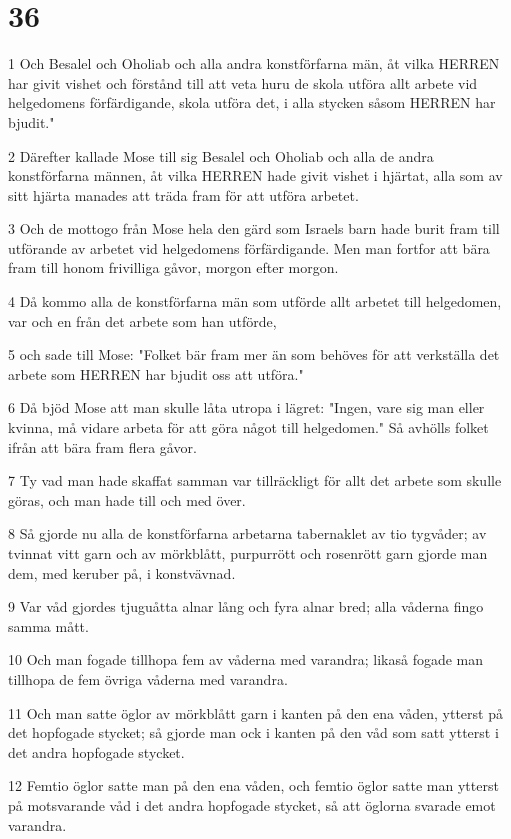 \chapter{36}

\par 1 Och Besalel och Oholiab och alla andra konstförfarna män, åt vilka HERREN har givit vishet och förstånd till att veta huru de skola utföra allt arbete vid helgedomens förfärdigande, skola utföra det, i alla stycken såsom HERREN har bjudit."
\par 2 Därefter kallade Mose till sig Besalel och Oholiab och alla de andra konstförfarna männen, åt vilka HERREN hade givit vishet i hjärtat, alla som av sitt hjärta manades att träda fram för att utföra arbetet.
\par 3 Och de mottogo från Mose hela den gärd som Israels barn hade burit fram till utförande av arbetet vid helgedomens förfärdigande. Men man fortfor att bära fram till honom frivilliga gåvor, morgon efter morgon.
\par 4 Då kommo alla de konstförfarna män som utförde allt arbetet till helgedomen, var och en från det arbete som han utförde,
\par 5 och sade till Mose: "Folket bär fram mer än som behöves för att verkställa det arbete som HERREN har bjudit oss att utföra."
\par 6 Då bjöd Mose att man skulle låta utropa i lägret: "Ingen, vare sig man eller kvinna, må vidare arbeta för att göra något till helgedomen." Så avhölls folket ifrån att bära fram flera gåvor.
\par 7 Ty vad man hade skaffat samman var tillräckligt för allt det arbete som skulle göras, och man hade till och med över.
\par 8 Så gjorde nu alla de konstförfarna arbetarna tabernaklet av tio tygvåder; av tvinnat vitt garn och av mörkblått, purpurrött och rosenrött garn gjorde man dem, med keruber på, i konstvävnad.
\par 9 Var våd gjordes tjuguåtta alnar lång och fyra alnar bred; alla våderna fingo samma mått.
\par 10 Och man fogade tillhopa fem av våderna med varandra; likaså fogade man tillhopa de fem övriga våderna med varandra.
\par 11 Och man satte öglor av mörkblått garn i kanten på den ena våden, ytterst på det hopfogade stycket; så gjorde man ock i kanten på den våd som satt ytterst i det andra hopfogade stycket.
\par 12 Femtio öglor satte man på den ena våden, och femtio öglor satte man ytterst på motsvarande våd i det andra hopfogade stycket, så att öglorna svarade emot varandra.
